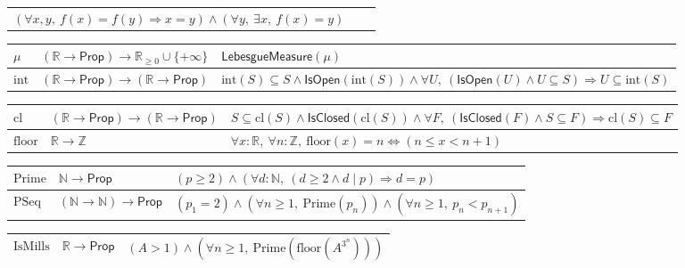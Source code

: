 \documentclass[11pt,reqno]{amsart}
\theoremstyle{blueplain}
\numberwithin{equation}{section}
\begin{document}
{\begin{tabular}{|m{5cm}|m{5cm}|m{8.3cm}|}
		$(\forall x,y,\ f(x)=f(y)\Rightarrow x=y)\wedge(\forall y,\ \exists x,\ f(x)=y)$ \\ 
	\end{tabular}%
	\noindent \newline
	\noindent 
	\begin{tabular}{|m{5cm}|m{5cm}|m{8.3cm}|}
		\hline
		$\mu$ & $(\mathbb{R}\to\mathsf{Prop})\to\mathbb{R}_{\geq 0}\cup\{+\infty\}$ &
		$\mathsf{LebesgueMeasure}(\mu)$ \\ \hline
		$\mathrm{int}$ & $(\mathbb{R}\to\mathsf{Prop})\to(\mathbb{R}\to\mathsf{Prop})$ &
		$\mathrm{int}(S)\subseteq S\wedge\mathsf{IsOpen}(\mathrm{int}(S))
		\wedge\forall U,\ (\mathsf{IsOpen}(U)\wedge U\subseteq S)\Rightarrow
		U\subseteq\mathrm{int}(S)$ \\ 
	\end{tabular}
	\noindent \newline
	\noindent
	\begin{tabular}{|m{5cm}|m{5cm}|m{8.3cm}|}
		\hline
		$\mathrm{cl}$ & $(\mathbb{R}\to\mathsf{Prop})\to(\mathbb{R}\to\mathsf{Prop})$ &
		$S\subseteq\mathrm{cl}(S)\wedge\mathsf{IsClosed}(\mathrm{cl}(S))
		\wedge\forall F,\ (\mathsf{IsClosed}(F)\wedge S\subseteq F)\Rightarrow
		\mathrm{cl}(S)\subseteq F$ \\ \hline
		$\mathrm{floor}$ & $\mathbb{R}\to\mathbb{Z}$ &
		$\forall x:\mathbb{R},\ \forall n:\mathbb{Z},\ \mathrm{floor}(x)=n
		\iff(n\leq x<n+1)$ \\ 
	\end{tabular}%
	\noindent \newline
	\noindent
	\begin{tabular}{|m{5cm}|m{5cm}|m{8.3cm}|}
		\hline
		$\mathrm{Prime}$ & $\mathbb{N}\to\mathsf{Prop}$ &
		$(p\geq 2)\wedge(\forall d:\mathbb{N},\ (d\geq 2\wedge d\mid p)
		\Rightarrow d=p)$ \\ \hline
		$\mathrm{PSeq}$ & $(\mathbb{N}\to\mathbb{N})\to\mathsf{Prop}$ &
		$(p_1=2)\wedge(\forall n\geq 1,\ \mathrm{Prime}(p_n))
		\wedge(\forall n\geq 1,\ p_n<p_{n+1})$ \\ 
	\end{tabular}%
	\noindent \newline
	\noindent
	\begin{tabular}{|m{5cm}|m{5cm}|m{8.3cm}|}
		\hline
		$\mathrm{IsMills}$ & $\mathbb{R}\to\mathsf{Prop}$ &
		$(A>1)\wedge(\forall n\geq 1,\ \mathrm{Prime}(\mathrm{floor}(A^{3^n})))$ \\ \hline

\end{tabular}}
\end{document}
